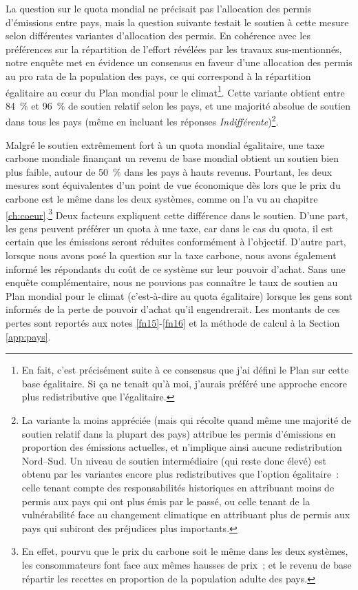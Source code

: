\documentclass[a5paper,french,openany]{memoir}
\begin{document}
La question sur le quota mondial ne précisait pas l'allocation des permis d'émissions entre pays, mais la question suivante testait le soutien à cette mesure selon différentes variantes d'allocation des permis. En cohérence avec les préférences sur la répartition de l'effort révélées par les travaux sus-mentionnés, notre enquête met en évidence un consensus en faveur d'une allocation des permis au pro rata de la population des pays, ce qui correspond à la répartition égalitaire au cœur du Plan mondial pour le climat\footnote{En fait, c'est précisément suite à ce consensus que j'ai défini le Plan sur cette base égalitaire. Si ça ne tenait qu'à moi, j'aurais préféré une approche encore plus redistributive que l'égalitaire.}. Cette variante obtient entre 84~\% et 96~\% de soutien relatif selon les pays, et une majorité absolue de soutien dans tous les pays (même en incluant les réponses \textit{Indifférent\textperiodcentered{}e})\footnote{La variante la moins appréciée (mais qui récolte quand même une majorité de soutien relatif dans la plupart des pays) attribue les permis d'émissions en proportion des émissions actuelles, et n'implique ainsi aucune redistribution Nord--Sud. Un niveau de soutien intermédiaire (qui reste donc élevé) est obtenu par les variantes encore plus redistributives que l'option égalitaire~: celle tenant compte des responsabilités historiques en attribuant moins de permis aux pays qui ont plus émis par le passé, ou celle tenant de la vulnérabilité face au changement climatique en attribuant plus de permis aux pays qui subiront des préjudices plus importants.}.

Malgré le soutien extrêmement fort à un quota mondial égalitaire, une taxe carbone mondiale finançant un revenu de base mondial obtient un soutien bien plus faible, autour de 50~\% dans les pays à hauts revenus. Pourtant, les deux mesures sont équivalentes d'un point de vue économique dès lors que le prix du carbone est le même dans les deux systèmes, comme on l'a vu au chapitre \ref{ch:coeur}.\footnote{En effet, pourvu que le prix du carbone soit le même dans les deux systèmes, les consommateurs font face aux mêmes hausses de prix~; et le revenu de base répartir les recettes en proportion de la population adulte des pays.} 
Deux facteurs expliquent cette différence dans le soutien. D'une part, les gens peuvent préférer un quota à une taxe, car dans le cas du quota, il est certain que les émissions seront réduites conformément à l'objectif. D'autre part, lorsque nous avons posé la question sur la taxe carbone, nous avons également informé les répondants du coût de ce système sur leur pouvoir d'achat. Sans une enquête complémentaire, nous ne pouvions pas connaître le taux de soutien au Plan mondial pour le climat (c'est-à-dire au quota égalitaire) lorsque les gens sont informés de la perte de pouvoir d'achat qu'il engendrerait. Les montants de ces pertes sont reportés aux notes \ref{fn15}-\ref{fn16} et la méthode de calcul à la Section \ref{app:pays}.  
\end{document}
